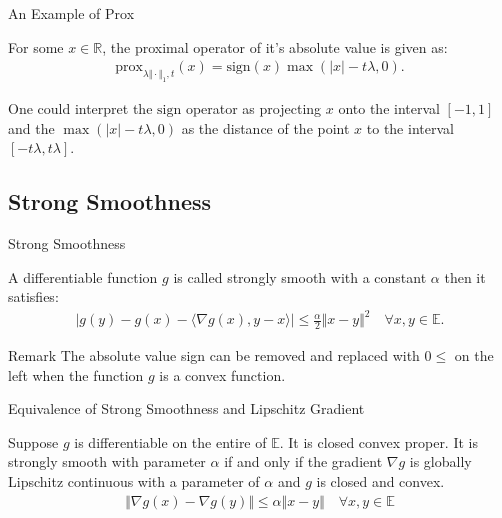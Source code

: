 \documentclass[11pt]{beamer}
\begin{document}
        \begin{frame}{An Example of Prox}
            \begin{definition}
                For some $x \in \mathbb R$, the proximal operator of it's absolute value is given as:
                \begin{align*}
                   \text{prox}_{\lambda \Vert\cdot \Vert_1, t}(x) = \text{sign}(x)\max(|x| - t\lambda , 0). 
                \end{align*}
            \end{definition}
            One could interpret the $\text{sign}$ operator as projecting $x$ onto the interval $[-1, 1]$ and the $\max(|x| - t\lambda , 0)$ as the distance of the point $x$ to the interval $[-t\lambda, t\lambda]$. 
        \end{frame}
        
    \subsection{Strong Smoothness}
        \begin{frame}{Strong Smoothness}
            \begin{definition}\label{def:strong_smoothness}
                A differentiable function $g$ is called strongly smooth with a constant $\alpha$ then it satisfies: 
                \begin{align}
                    |g(y) - g(x) - 
                    \langle \nabla g(x), y - x
                    \rangle| \le \frac{\alpha}{2}\Vert x - y\Vert^2
                    \quad \forall x, y\in \mathbb E. 
                \end{align}    
            \end{definition}
            \begin{block}{Remark}
                The absolute value sign can be removed and replaced with $0\le$ on the left when the function $g$ is a convex function.
            \end{block}
        \end{frame}
        \begin{frame}{Equivalence of Strong Smoothness and Lipschitz Gradient}
            \begin{theorem}
                Suppose $g$ is differentiable on the entire of $\mathbb E$. It is closed convex proper. It is strongly smooth with parameter $\alpha$ if and only if the gradient $\nabla g$ is globally Lipschitz continuous with a parameter of $\alpha$ and $g$ is closed and convex. 
                \begin{align*}
                    \Vert \nabla g(x) -\nabla g(y)\Vert \le 
                    \alpha 
                    \Vert x - y \Vert\quad \forall x, y\in \mathbb E
                \end{align*}
            \end{theorem}
            
        \end{frame}
\end{document}
